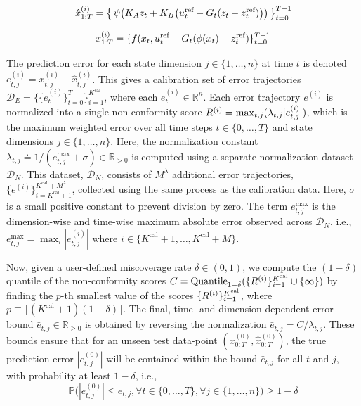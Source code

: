 \noindent\begin{minipage}[b]{0.54\textwidth}
\begin{equation}\small
\label{eq:latent_rollout}
\hspace{-5pt}\hat{x}_{1:T}^{(i)} =
\bigl\{\, \psi\bigl(K_{A} z_{t} + K_{B}\bigl(u^{\text{ref}}_t - G_t(z_t - z^{\text{ref}}_t)\bigr)\bigr) \,\bigr\}_{t=0}^{T-1}\hspace{-6pt}
\end{equation}
\end{minipage}%
\hspace{\fill} %
\begin{minipage}[b]{0.44\textwidth} 
\begin{equation}\small
\label{eq:actual_rollout}
\hspace{-1pt}x_{1:T}^{(i)} = \{f(x_t, u^{\text{ref}}_t - G_t (\phi(x_t) - z^{\text{ref}}_t)\}_{t=0}^{T-1}
\end{equation}
\end{minipage}

The prediction error for each state dimension $j \in \{1, \dots, n\}$ at time $t$ is denoted $e_{t,j}^{(i)} = x_{t,j}^{(i)} - \hat{x}_{t,j}^{(i)}$. This gives a calibration set of error trajectories $\mathcal{D}_{E} = \{\{e_{t}^{(i)}\}_{t=0}^{T}\}_{i=1}^{K^{\text{cal}}}$, where each $e_t^{(i)} \in \mathbb{R}^n$. Each error trajectory $e^{(i)}$ is normalized into a single non-conformity score $R^{(i)} = \max_{t,j} ( \lambda_{t,j} |e_{t,j}^{(i)}|)$, which is the maximum weighted error over all time steps $t \in \{0, \dots, T\}$ and state dimensions $j \in \{1, \dots, n\}$. Here, the normalization constant $\lambda_{t,j} \doteq 1 / (e_{t,j}^{\text{max}} + \sigma) \in \mathbb{R}_{> 0}$ is computed using a separate normalization dataset $\mathcal{D}_N$. This dataset, $\mathcal{D}_N$, consists of $M^{\lambda}$ additional error trajectories, $\{e^{(i)}\}_{i=K^{\text{cal}}+1}^{K^{\text{cal}}+M^{\lambda}}$, collected using the same process as the calibration data. Here, $\sigma$ is a small positive constant to prevent division by zero. The term $e_{t,j}^{\text{max}}$ is the dimension-wise and time-wise maximum absolute error observed across $\mathcal{D}_N$, i.e., $e_{t,j}^{\text{max}} = \max_{i} |e_{t,j}^{(i)}|$ where $i \in \{K^{\text{cal}}+1, \dots, K^{\text{cal}}+M\}$. 

Now, given a user-defined miscoverage rate $\delta \in (0, 1)$, we compute the $(1-\delta)$ quantile of the non-conformity scores $C = \text{Quantile}_{1-\delta}(\{R^{(i)}\}_{i=1}^{K^{\text{cal}}} \cup \{\infty\})$ by finding the $p$-th smallest value of the scores $\{R^{(i)}\}_{i=1}^{K^{\text{cal}}}$, where $p \equiv \lceil (K^{\text{cal}} + 1)(1-\delta) \rceil$. The final, time- and dimension-dependent error bound $\bar e_{t,j} \in \mathbb{R}_{\ge 0}$ is obtained by reversing the normalization $\bar e_{t,j} = C / \lambda_{t,j}$. These bounds ensure that for an unseen test data-point $(x_{0:T}^{(0)}, \hat x_{0:T}^{(0)})$, the true prediction error $|e_{t,j}^{(0)}|$ will be contained within the bound $\bar e_{t,j}$ for all $t$ and $j$, with probability at least $1-\delta$, i.e.,
$$\mathbb{P}\big( |e_{t,j}^{(0)}| \le \bar e_{t,j}, \forall t \in \{0, \dots, T\}, \forall j \in \{1, \dots, n\} \big) \ge 1 - \delta$$


